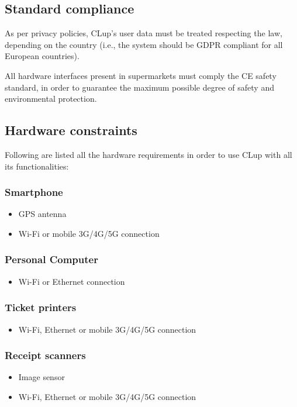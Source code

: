 \documentclass[../../main.tex]{subfiles}
\begin{document}
	\subsection{Standard compliance}

	As per privacy policies, CLup's user data must be treated respecting the law, depending on the 
	country (i.e., the system should be GDPR compliant for all European countries).

	All hardware interfaces present in supermarkets must comply the CE safety standard, in order to guarantee 
	the maximum possible degree of safety and environmental protection.

	\subsection{Hardware constraints}

	Following are listed all the hardware requirements in order to use CLup with all its functionalities:

	\subsubsection*{Smartphone}
	\begin{itemize}

		\item GPS antenna

		\item Wi-Fi or mobile 3G/4G/5G connection

	\end{itemize}

	\subsubsection*{Personal Computer}
	\begin{itemize}

		\item Wi-Fi or Ethernet connection

	\end{itemize}

	\subsubsection*{Ticket printers}
	\begin{itemize}

		\item Wi-Fi, Ethernet or mobile 3G/4G/5G connection

	\end{itemize}

	\subsubsection*{Receipt scanners}
	\begin{itemize}

		\item Image sensor

		\item Wi-Fi, Ethernet or mobile 3G/4G/5G connection

	\end{itemize}
	
\end{document}
